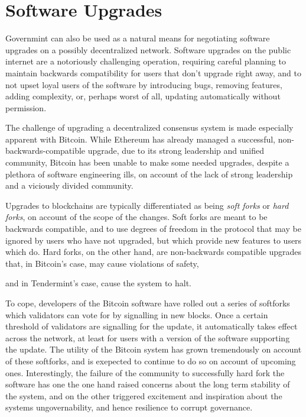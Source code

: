 \section{Software Upgrades}

Governmint can also be used as a natural means for negotiating software upgrades on a possibly decentralized network.
Software upgrades on the public internet are a notoriously challenging operation,
requiring careful planning to maintain backwards compatibility for users that don't upgrade right away,
and to not upset loyal users of the software by introducing bugs, removing features, adding complexity, or,
perhaps worst of all, updating automatically without permission.

The challenge of upgrading a decentralized consensus system is made especially apparent with Bitcoin.
While Ethereum has already managed a successful, non-backwards-compatible upgrade, 
due to its strong leadership and unified community,
Bitcoin has been unable to make some needed upgrades,
despite a plethora of software engineering ills,
on account of the lack of strong leadership and a viciously divided community.

Upgrades to blockchains are typically differentiated as being \emph{soft forks} or \emph{hard forks},
on account of the scope of the changes.
Soft forks are meant to be backwards compatible, and to use degrees of freedom in the protocol that may be ignored
by users who have not upgraded, but which provide new features to users which do.
Hard forks, on the other hand, are non-backwards compatible upgrades that,
in Bitcoin's case, may cause violations of safety, 

and in Tendermint's case, cause the system to halt.

To cope, developers of the Bitcoin software have rolled out a series of softforks which validators can vote for
by signalling in new blocks. 
Once a certain threshold of validators are signalling for the update,
it automatically takes effect across the network, at least for users with a version of the software supporting the update.
The utility of the Bitcoin system has grown tremendously on account of these softforks, 
and is exepected to continue to do so on account of upcoming ones.
Interestingly, the failure of the community to successfully hard fork the software has
one the one hand raised concerns about the long term stability of the system,
and on the other triggered excitement and inspiration about the systems ungovernability,
and hence resilience to corrupt governance.

